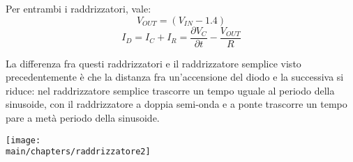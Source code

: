 \documentclass[\main/main.tex]{subfiles}
\begin{document}
Per entrambi i raddrizzatori, vale:
\[V_{OUT} = (V_{IN}-1.4)\]
\[I_D = I_C + I_R= \frac{\partial{V_C}}{\partial{t}} - \frac{V_{OUT}}{R} \]

La differenza fra questi raddrizzatori e il raddrizzatore semplice visto precedentemente è che la distanza fra un'accensione del diodo e la successiva si riduce: nel raddrizzatore semplice trascorre un tempo uguale al periodo della sinusoide, con il raddrizzatore a doppia semi-onda e a ponte trascorre un tempo pare a metà periodo della sinusoide.

\begin{center}
\texttt{[image: \\main/chapters/raddrizzatore2]}
\end{center}
\end{document}

